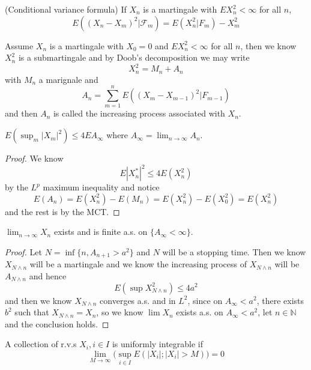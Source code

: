 \documentclass[lang=en, color=blue, ]{elegantbook}
\newcommand{\F}{\mathcal{F}}
\newcommand{\N}{\mathbb{N}}
\begin{document}
\begin{theorem}
    (Conditional variance formula) If $X_n$ is a martingale with $EX_n^2 < \infty$ for all $n$,
    \[E((X_n-X_m)^2|\F_m) = E(X_n^2|F_m) - X_m^2\]
\end{theorem}

\begin{definition}
    Assume $X_n$ is a martingale with $X_0 = 0$ and $EX_n^2 < \infty$ for all $n$, then we know $X_n^2$ is a submartingale and by Doob's decomposition we may write
    \[X_n^2 = M_n+A_n\]
    with $M_n$ a marignale and
    \[A_n = \sum\limits_{m=1}^n E((X_m-X_{m-1})^2|F_{m-1})\]
    and then $A_n$ is called the increasing process associated with $X_n$. 
\end{definition}

\begin{theorem}
    $E(\sup_m|X_m|^2) \leq 4EA_{\infty}$ where $A_{\infty} = \lim_{n\to\infty}{A_n}$.
\end{theorem}
\begin{proof}
    We know
    \[
    E|X_n^*|^2 \leq 4 E(X_n^2)
    \]
    by the $L^p$ maximum inequality and notice
    \[
    E(A_n) = E(X_n^2)- E(M_n) = E(X_n^2) - E(X_0^2) = E(X_n^2)
    \]
    and the rest is by the MCT.
\end{proof}

\begin{theorem}
    $\lim_{n\to\infty} X_n$ exists and is finite a.s. on $\{A_{\infty} < \infty\}$.
\end{theorem}
\begin{proof}
    Let $N = \inf\{n, A_{n+1}>a^2\}$ and $N$ will be a stopping time. Then we know $X_{N\wedge n}$ will be a martingale and we know the increasing process of $X_{N\wedge n}$ will be $A_{N\wedge n}$ and hence
    \[E(\sup X_{N\wedge n}^2) \leq 4 a^2\]
    and then we know $X_{N\wedge n}$ converges a.s. and in $L^2$, since on $A_{\infty} < a^2$, there exists $b^2$ such that $X_{N\wedge n} = X_n$, so we know $\lim X_n$ exists a.s. on $A_{\infty} < a^2$, let $n \in \N$ and the conclusion holds.
\end{proof}

\begin{definition}
    A collection of r.v.s $X_i, i\in I$ is uniformly integrable if
    \[
    \lim_{M\to\infty}\Big(\sup_{i\in I} E(|X_i|;|X_i|>M)\Big) = 0
    \]
\end{definition}
\end{document}
